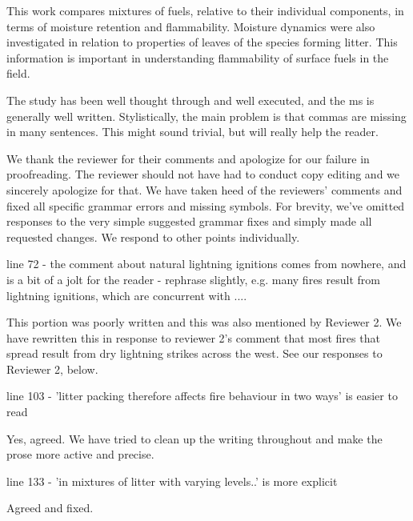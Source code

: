 \documentclass[letterpaper, 12pt]{letter}
\begin{document}
\begin{letter}{}
\begin{quoting}
  This work compares mixtures of fuels, relative to their individual
  components, in terms of moisture retention and flammability. Moisture
  dynamics were also investigated in relation to properties of leaves of the
  species forming litter. This information is important in understanding
  flammability of surface fuels in the field.

  The study has been well thought through and well executed, and the ms is
  generally well written. Stylistically, the main problem is that commas are
  missing in many sentences. This might sound trivial, but will really help the
  reader.
\end{quoting}

We thank the reviewer for their comments and apologize for our failure in
proofreading. The reviewer should not have had to conduct copy editing and we
sincerely apologize for that. We have taken heed of the reviewers' comments and
fixed all specific grammar errors and missing symbols. For brevity, we've
omitted responses to the very simple suggested grammar fixes and simply made
all requested changes. We respond to other points individually.

\begin{quoting}
  line 72 - the comment about natural lightning ignitions comes from nowhere,
  and is a bit of a jolt for the reader - rephrase slightly, e.g. many fires
  result from lightning ignitions, which are concurrent with ....
\end{quoting}

This portion was poorly written and this was also mentioned by Reviewer 2. We
have rewritten this in response to reviewer 2's comment that most fires that
spread result from dry lightning strikes across the west. See our responses to
Reviewer 2, below.

\begin{quoting}
  line 103 - 'litter packing therefore affects fire behaviour in two ways' is
  easier to read
\end{quoting}

Yes, agreed. We have tried to clean up the writing throughout and make the
prose more active and precise.

\begin{quoting}
  line 133 - 'in mixtures of litter with varying levels..' is more explicit
\end{quoting}

Agreed and fixed.


\end{letter}
\end{document}

